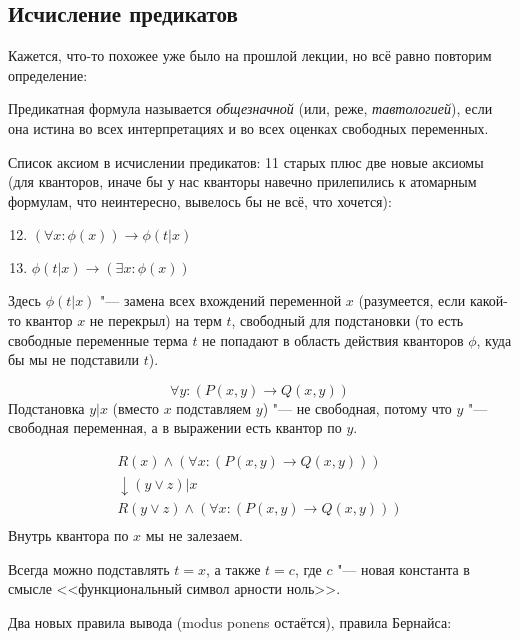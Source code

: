 \subsection{Исчисление предикатов}
Кажется, что-то похожее уже было на прошлой лекции, но всё равно повторим определение:
\begin{Def}
	Предикатная формула называется \textsl{общезначной} (или, реже, \textsl{тавтологией}),
	если она истина во всех интерпретациях и во всех оценках свободных переменных.
\end{Def}
Список аксиом в исчислении предикатов: 11 старых плюс две новые аксиомы
(для кванторов, иначе бы у нас кванторы навечно прилепились к атомарным формулам, что неинтересно,
вывелось бы не всё, что хочется):
\begin{enumerate}
	\setcounter{enumi}{11}
	\item $(\forall x \colon \phi(x)) \to \phi(t|x)$
	\item $\phi(t|x) \to (\exists x \colon \phi(x))$
\end{enumerate}
Здесь $\phi(t|x)$ "--- замена всех вхождений переменной $x$ (разумеется, если какой-то квантор $x$ не перекрыл)
на терм $t$, свободный для подстановки (то есть свободные переменные терма $t$ не попадают в область действия кванторов $\phi$,
куда бы мы не подставили $t$).
\begin{exmp}
	\[ \forall y \colon (P(x, y) \to Q(x, y)) \]
	Подстановка $y|x$ (вместо $x$ подставляем $y$) "--- не свободная, потому что $y$ "--- свободная переменная, а в выражении есть
	квантор по $y$.
\end{exmp}
\begin{exmp}
	\begin{gather*}
		R(x) \land (\forall x \colon (P(x, y) \to Q(x, y))) \\
		\downarrow (y\lor z)|x \\
		R(y \lor z) \land (\forall x \colon (P(x, y) \to Q(x, y))) \\
	\end{gather*}
	Внутрь квантора по $x$ мы не залезаем.
\end{exmp}
\begin{exmp}
	Всегда можно подставлять $t=x$, а также $t=c$, где $c$ "--- новая константа в смысле <<функциональный символ арности ноль>>.
\end{exmp}
Два новых правила вывода (modus ponens остаётся), правила Бернайса:
